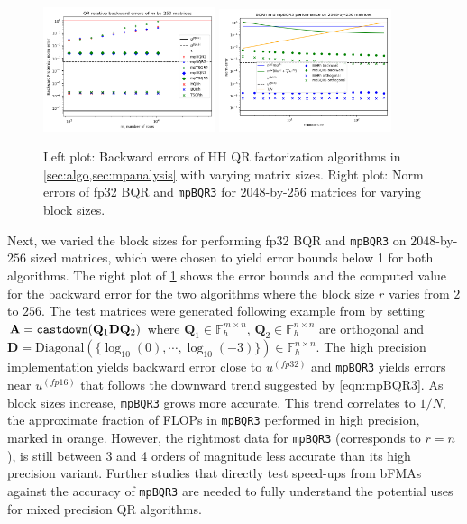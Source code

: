 \documentclass[review,onefignum,onetabnum]{siamart190516}
\newcommand{\F}{\mathbb{F}}
\newcommand{\bb}[1]{\mathbf{#1}}
\begin{document}
\begin{figure}[h!]
	\centering
	\vspace{-10pt}
	\includegraphics[width=0.45\textwidth]{../figures/fixedn.png}
	\includegraphics[width=0.45\textwidth]{../figures/mpBQR3-blocksize-1108.png}
	\caption{\label{fig:sizemp3}Left plot: Backward errors of HH QR factorization algorithms in \cref{sec:algo,sec:mpanalysis} with varying matrix sizes.
		Right plot: Norm errors of fp32 BQR and {\tt mpBQR3} for $2048$-by-$256$ matrices for varying block sizes.}
	\vspace{-10pt}
\end{figure} 

Next, we varied the block sizes for performing fp32 BQR and {\tt mpBQR3} on $2048$-by-$256$ sized matrices, which were chosen to yield error bounds below 1 for both algorithms.
The right plot of \cref{fig:sizemp3} shows the error bounds and the computed value for the backward error for the two algorithms where the block size $r$ varies from $2$ to $256$. 
The test matrices were generated following example from \cite{Blanchard2020} by setting $\bb{A}={\tt castdown}(\bb{Q}_1\bb{D}\bb{Q}_2)$ where $\bb{Q}_1\in\F_h^{m\times n}$, $\bb{Q}_2\in\F_h^{n\times n}$ are orthogonal and $\bb{D}=\mathrm{Diagonal}(\{\log_{10}(0),\cdots, \log_{10}(-3)\})\in\F_h^{n\times n}$.  
The high precision implementation yields backward error close to $u^{(fp32)}$ and {\tt mpBQR3} yields errors near $u^{(fp16)}$ that follows the downward trend suggested by \cref{eqn:mpBQR3}.
As block sizes increase, {\tt mpBQR3} grows more accurate. 
This trend correlates to $1/N$, the approximate fraction of FLOPs in {\tt mpBQR3} performed in high precision, marked in orange.
However, the rightmost data for {\tt mpBQR3} (corresponds to $r=n$), is still between 3 and 4 orders of magnitude less accurate than its high precision variant. 
Further studies that directly test speed-ups from bFMAs against the accuracy of {\tt mpBQR3} are needed to fully understand the potential uses for mixed precision QR algorithms.
\end{document}
